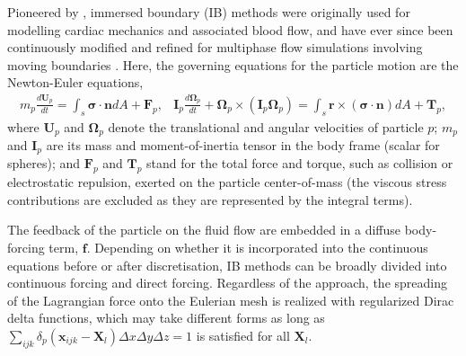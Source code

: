 Pioneered by \cite{Peskin}, immersed boundary (IB) methods were originally used for modelling cardiac mechanics and associated blood flow, and have ever since been continuously modified and refined for multiphase flow simulations involving moving boundaries \citep{fadlun_verzicco_orlandi_mohd-yusof_2000a, Uhlmann, mittal_iaccarino_2005a, pinelli_naqavi_piomelli_favier_2010a, Wim-Paul_JCP_2012, favier_revell_pinelli_2014a}.
Here, the governing equations for the particle motion are the Newton-Euler equations,
\begin{subequations} \label{eq:newton-euler}
  \begin{equation} 
    \begin{aligned} \label{eq:force-balance}
      m_p \frac{d{\bm U}_p}{dt} = \int_{s} \bm{\sigma \cdot n} dA + {\bm F}_p, 
    \end{aligned}
  \end{equation}
  \begin{equation} 
    \begin{aligned}
      {\bm I}_p \frac{d{\bm \Omega}_p}{dt} + {\bm \Omega}_p\times({\bm I}_p{\bm \Omega}_p) =
      \int_{s} \bm{r} \times (\bm{\sigma \cdot n}) dA + {\bm T}_p,
    \end{aligned}
  \end{equation}
\end{subequations}
where ${\bm U}_p$ and ${\bm \Omega}_p$ denote the translational and angular velocities of particle $p$;
$m_p$ and ${\bm I}_p$ are its mass and moment-of-inertia tensor in the body frame (scalar for spheres); and 
${\bm F}_p$ and ${\bm T}_p$ stand for the total force and torque, such as collision or electrostatic repulsion, exerted on the particle center-of-mass (the viscous stress contributions are excluded as they are represented by the integral terms).

The feedback of the particle on the fluid flow are embedded in a diffuse body-forcing term, $\bm f$.
Depending on whether it is incorporated into the continuous equations before or after discretisation, IB methods can be broadly divided into continuous forcing and direct forcing.
Regardless of the approach, the spreading of the Lagrangian force onto the Eulerian mesh is realized with regularized Dirac delta functions, which may take different forms as long as $\sum_{ijk} \delta_p( \bm{x}_{ijk}-\bm{X}_{l}) \Delta x \Delta y \Delta z=1$ is satisfied for all $\bm{X}_{l}$.

